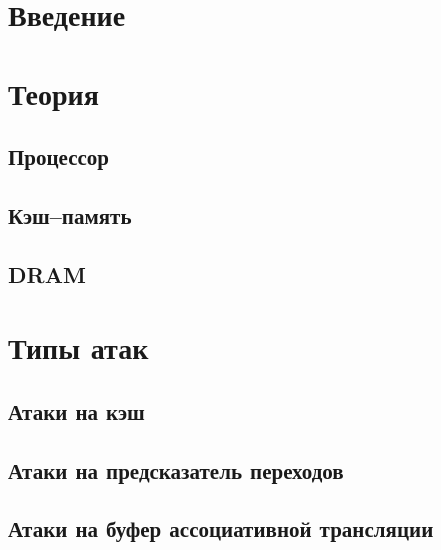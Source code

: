 \documentclass[final, xcolor = table, usenames, dvipsnames, table, aspectratio = 169]{beamer}
\begin{document}
\section{Введение}



\section{Теория}
\subsection{Процессор}


\subsection{Кэш--память}


\subsection{DRAM}




\section{Типы атак}
\subsection{Атаки на кэш}


\subsection{Атаки на предсказатель переходов}


\subsection{Атаки на буфер ассоциативной трансляции}

\end{document}
